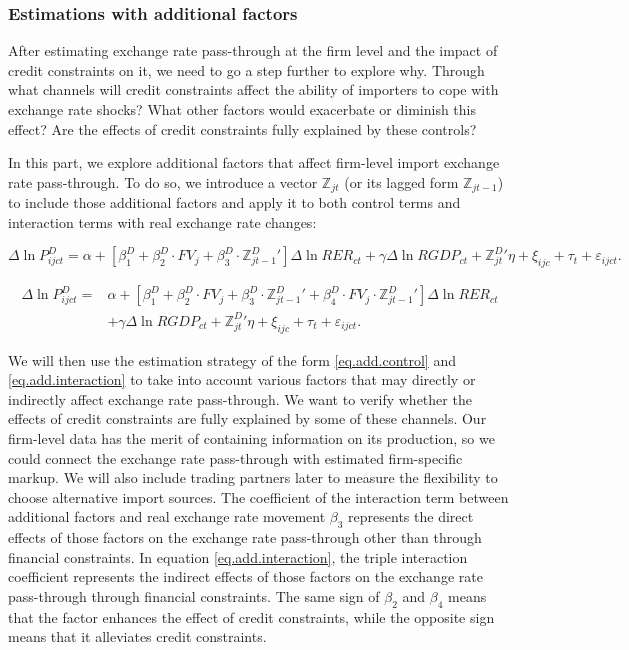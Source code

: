 \documentclass[12pt]{article}
\begin{document}
\subsubsection{Estimations with additional factors}

After estimating exchange rate pass-through at the firm level and the impact of credit constraints on it, we need to go a step further to explore why. Through what channels will credit constraints affect the ability of importers to cope with exchange rate shocks? What other factors would exacerbate or diminish this effect? Are the effects of credit constraints fully explained by these controls?

In this part, we explore additional factors that affect firm-level import exchange rate pass-through. To do so, we introduce a vector $\mathbb{Z}_{jt}$ (or its lagged form $\mathbb{Z}_{jt-1}$) to include those additional factors and apply it to both control terms and interaction terms with real exchange rate changes: 

\begin{equation}
	\Delta \ln P^{D}_{ijct}=\alpha+[\beta^D_{1}+ \beta^D_{2} \cdot FV_{j}+\beta^D_{3} \cdot {\mathbb{Z}^{D}_{jt-1}}'] \Delta \ln RER_{ct} +\gamma \Delta \ln RGDP_{ct}+ {\mathbb{Z}^{D}_{jt}}' \eta+\xi_{ijc}+\tau_{t} +\varepsilon_{ijct}.
	\label{eq.add.control}
\end{equation}

\begin{equation}
	\begin{aligned}
	\Delta \ln P^{D}_{ijct}=&\alpha+[\beta^D_{1}+ \beta^D_{2} \cdot FV_{j}+\beta^D_{3} \cdot {\mathbb{Z}^{D}_{jt-1}}'+\beta^D_{4} \cdot FV_{j} \cdot {\mathbb{Z}^{D}_{jt-1}}'] \Delta \ln RER_{ct} \\ &+\gamma \Delta \ln RGDP_{ct}+ {\mathbb{Z}^{D}_{jt}}' \eta+\xi_{ijc}+\tau_{t} +\varepsilon_{ijct}.
	\end{aligned}	
	\label{eq.add.interaction}
\end{equation}

We will then use the estimation strategy of the form \ref{eq.add.control} and \ref{eq.add.interaction} to take into account various factors that may directly or indirectly affect exchange rate pass-through. We want to verify whether the effects of credit constraints are fully explained by some of these channels. Our firm-level data has the merit of containing information on its production, so we could connect the exchange rate pass-through with estimated firm-specific markup. We will also include trading partners later to measure the flexibility to choose alternative import sources. The coefficient of the interaction term between additional factors and real exchange rate movement $\beta_3$ represents the direct effects of those factors on the exchange rate pass-through other than through financial constraints. In equation \ref{eq.add.interaction}, the triple interaction coefficient represents the indirect effects of those factors on the exchange rate pass-through through financial constraints. The same sign of $\beta_2$ and $\beta_4$ means that the factor enhances the effect of credit constraints, while the opposite sign means that it alleviates credit constraints.
\end{document}
